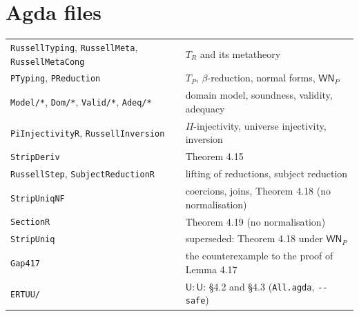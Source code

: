 \documentclass[10pt]{article}
\newcommand{\U}{\mathsf{U}}
\newcommand{\TR}{T_R}
\newcommand{\TP}{T_P}
\newcommand{\WN}{\mathsf{WN}_P}
\newcommand{\agda}[1]{\texttt{#1}}
\theoremstyle{remark}
\begin{document}
\section*{Agda files}
\begin{tabular}{@{}ll@{}}
\toprule
\agda{RussellTyping}, \agda{RussellMeta}, \agda{RussellMetaCong} & $\TR$ and its metatheory \\
\agda{PTyping}, \agda{PReduction} & $\TP$, $\beta$-reduction, normal forms, $\WN$ \\
\agda{Model/*}, \agda{Dom/*}, \agda{Valid/*}, \agda{Adeq/*} & domain model, soundness, validity, adequacy \\
\agda{PiInjectivityR}, \agda{RussellInversion} & $\Pi$-injectivity, universe injectivity, inversion \\
\agda{StripDeriv} & Theorem 4.15 \\
\agda{RussellStep}, \agda{SubjectReductionR} & lifting of reductions, subject reduction \\
\agda{StripUniqNF} & coercions, joins, Theorem 4.18 (no normalisation) \\
\agda{SectionR} & Theorem 4.19 (no normalisation) \\
\agda{StripUniq} & superseded: Theorem 4.18 under $\WN$ \\
\agda{Gap417} & the counterexample to the proof of Lemma 4.17 \\
\texttt{ERTUU/} & $\U:\U$: §4.2 and §4.3 (\agda{All.agda}, \verb|--safe|) \\
\bottomrule
\end{tabular}
\end{document}
